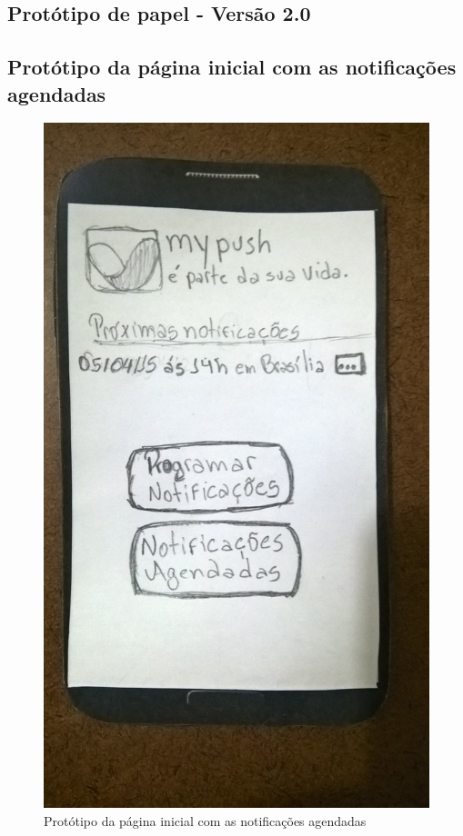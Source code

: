 \begin{apendicesenv}
\chapter{Protótipo de papel - Versão 2.0}
  
  \section*{Protótipo da página inicial com as notificações agendadas}
  
    \begin{figure}[!htbp]
      \centering
      \includegraphics[scale=0.32, angle=-90]{editaveis/figuras/prototipo_papel_v2/pagina_inicial}
      \caption{Protótipo da página inicial com as notificações agendadas}
      \label{pagina_inicial_v2}
    \end{figure}
  

\end{apendicesenv}
